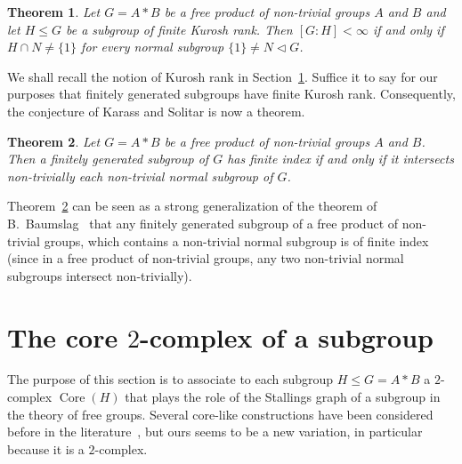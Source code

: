 \documentclass[11pt,reqno]{amsart}
\newtheorem{Thm}{Theorem}
\begin{document}
\begin{Thm}\label{main}
Let $G=A\ast B$ be a free product of non-trivial groups $A$ and $B$ and let $H\leq G$ be a subgroup of finite Kurosh rank.  Then $[G:H]<\infty$ if and only if $H\cap N\neq \{1\}$ for every normal subgroup $\{1\}\neq N\lhd G$.
\end{Thm}

We shall recall the notion of Kurosh rank in Section~\ref{core}.  Suffice it to say for our purposes that finitely generated subgroups have finite Kurosh rank.  Consequently, the conjecture of Karass and Solitar is now a theorem.

\begin{Thm}\label{main2}
Let $G=A\ast B$ be a free product of non-trivial groups $A$ and $B$.  Then a finitely generated subgroup of $G$ has finite index if and only if it intersects non-trivially each non-trivial normal subgroup of $G$.
\end{Thm}

Theorem~\ref{main2} can be seen as a strong generalization of the theorem of B.~Baumslag~\cite{BBaumslag} that any finitely generated subgroup of a free product of non-trivial groups, which contains a non-trivial normal subgroup is of finite index (since in a free product of non-trivial groups, any two non-trivial normal subgroups intersect non-trivially).

\section{The core $2$-complex of a subgroup}\label{core}
The purpose of this section is to associate to each subgroup $H\leq G=A\ast B$ a $2$-complex ${\mathop{\mathrm{Core}}\nolimits}(H)$ that plays the role of the Stallings graph of a subgroup in the theory of free groups.  Several core-like constructions have been considered before in the literature~\cite{BurnsCompany,Ivanov,sykiotis}, but ours seems to be a new variation, in particular because it is a $2$-complex.
\end{document}
